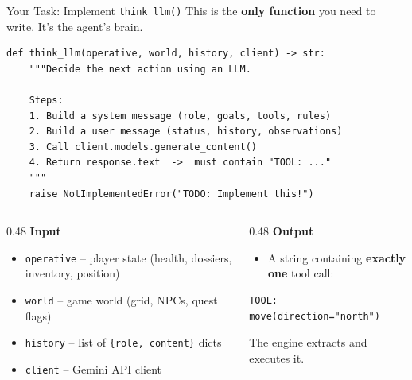 \documentclass[aspectratio=169,10pt]{beamer}
\newcommand{\mutedtext}[1]{\textcolor{textmuted}{#1}}
\begin{document}
\begin{frame}[fragile]{Your Task: Implement \texttt{think\_llm()}}
This is the \textbf{only function} you need to write. It's the agent's brain.
\begin{lstlisting}[style=pycode]
def think_llm(operative, world, history, client) -> str:
    """Decide the next action using an LLM.

    Steps:
    1. Build a system message (role, goals, tools, rules)
    2. Build a user message (status, history, observations)
    3. Call client.models.generate_content()
    4. Return response.text  ->  must contain "TOOL: ..."
    """
    raise NotImplementedError("TODO: Implement this!")
\end{lstlisting}
\vspace{0.2em}
\begin{columns}[T]
\begin{column}{0.48\textwidth}
  {\color{ethteal}\textbf{Input}}
  \begin{itemize}\setlength\itemsep{1pt}
    \item \texttt{operative} -- player state (health, dossiers, inventory, position)
    \item \texttt{world} -- game world (grid, NPCs, quest flags)
    \item \texttt{history} -- list of \texttt{\{role, content\}} dicts
    \item \texttt{client} -- Gemini API client
  \end{itemize}
\end{column}
\begin{column}{0.48\textwidth}
  {\color{ethteal}\textbf{Output}}
  \begin{itemize}
    \item A string containing \textbf{exactly one} tool call:
  \end{itemize}
  \begin{lstlisting}[style=textcode]
TOOL: move(direction="north")
  \end{lstlisting}
  \mutedtext{\scriptsize The engine extracts and executes it.}
\end{column}
\end{columns}
\end{frame}

\end{document}
